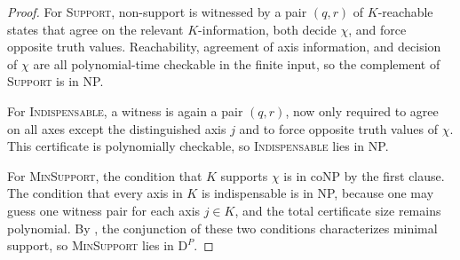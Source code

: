 \begin{proof}
For \textup{\textsc{Support}}, non-support is witnessed by a pair $(q,r)$ of $K$-reachable states that agree on the relevant $K$-information, both decide $\chi$, and force opposite truth values. Reachability, agreement of axis information, and decision of $\chi$ are all polynomial-time checkable in the finite input, so the complement of \textup{\textsc{Support}} is in NP.

For \textup{\textsc{Indispensable}}, a witness is again a pair $(q,r)$, now only required to agree on all axes except the distinguished axis $j$ and to force opposite truth values of $\chi$. This certificate is polynomially checkable, so \textup{\textsc{Indispensable}} lies in NP.

For \textup{\textsc{MinSupport}}, the condition that $K$ supports $\chi$ is in coNP by the first clause. The condition that every axis in $K$ is indispensable is in NP, because one may guess one witness pair for each axis $j\in K$, and the total certificate size remains polynomial. By , the conjunction of these two conditions characterizes minimal support, so \textup{\textsc{MinSupport}} lies in $\mathrm{D}^P$.
\end{proof}
